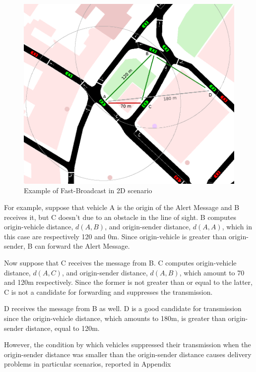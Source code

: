 		\begin{figure}[H]
			\centering
			\includegraphics[width=\textwidth]{immagini/fb-2dpicc}
			\caption{Example of Fast-Broadcast in 2D scenario}
			\label{fig:fb-2d}
		\end{figure}
		
		
		
		For example, suppose that vehicle A is the origin of the Alert Message and B receives it, but C doesn't due to an obstacle in the line of sight. B computes origin-vehicle distance, $d(A, B)$, and origin-sender distance, $d(A, A)$, which in this case are respectively 120 and 0m. Since origin-vehicle is greater than origin-sender, B can forward the Alert Message.
		
		
		Now suppose that C receives the message from B. C computes origin-vehicle distance, $d(A, C)$, and origin-sender distance, $d(A, B)$, which amount to 70 and 120m respectively. Since the former is not greater than or equal to the latter, C is not a candidate for forwarding and suppresses the transmission.
		
		
		D receives the message from B as well. D is a good candidate for transmission since the origin-vehicle distance, which amounts to 180m, is greater than origin-sender distance, equal to 120m.
		
		However, the condition by which vehicles suppressed their transmission when the origin-sender distance was smaller than the origin-sender distance causes delivery problems in particular scenarios, reported in Appendix %
		
